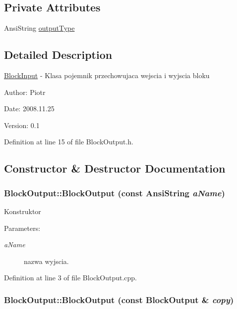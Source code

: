 \subsection*{Private Attributes}
\begin{CompactItemize}
\item 
AnsiString \hyperlink{classBlockOutput_80c32707c6e84083f5e69cf6170a3f26}{outputType}
\end{CompactItemize}


\subsection{Detailed Description}
\hyperlink{classBlockInput}{BlockInput} - Klasa pojemnik przechowujaca wejscia i wyjscia bloku \begin{Desc}
\item[Author:]Piotr \end{Desc}
\begin{Desc}
\item[Date:]2008.11.25 \end{Desc}
\begin{Desc}
\item[Version:]0.1 \end{Desc}


Definition at line 15 of file BlockOutput.h.

\subsection{Constructor \& Destructor Documentation}
\hypertarget{classBlockOutput_889e288fd7f8f4739b81681cd8975f63}{
\subsubsection[BlockOutput]{\setlength{\rightskip}{0pt plus 5cm}BlockOutput::BlockOutput (const AnsiString {\em aName})}}
\label{classBlockOutput_889e288fd7f8f4739b81681cd8975f63}


Konstruktor \begin{Desc}
\item[Parameters:]
\begin{description}
\item[{\em aName}]nazwa wyjscia. \end{description}
\end{Desc}


Definition at line 3 of file BlockOutput.cpp.\hypertarget{classBlockOutput_d880f19249a89fd90bd08ec822aa6fd1}{
\subsubsection[BlockOutput]{\setlength{\rightskip}{0pt plus 5cm}BlockOutput::BlockOutput (const {\bf BlockOutput} \& {\em copy})}}
\label{classBlockOutput_d880f19249a89fd90bd08ec822aa6fd1}


